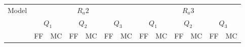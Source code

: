 \begin{table*}[h!]
\centering
\small
\begin{tabular}{l|p{0.7cm}p{0.6cm}|p{0.7cm}p{0.6cm}|p{0.7cm}p{0.6cm}|p{0.7cm}p{0.6cm}|p{0.7cm}p{0.6cm}|p{0.7cm}p{0.6cm}}
\hline
\multirow{3}{*}{Model} & \multicolumn{6}{c|}{$R_a2$}                                                               & \multicolumn{6}{c}{$R_a3$}                                                                \\ \cline{2-13}
                       & \multicolumn{2}{c}{$Q_1$} & \multicolumn{2}{c}{$Q_2$} & \multicolumn{2}{c|}{$Q_3$} & \multicolumn{2}{c}{$Q_1$} & \multicolumn{2}{c}{$Q_2$} & \multicolumn{2}{c}{$Q_3$} \\ \cline{2-13}
                       & FF           & MC           & FF           & MC           & FF            & MC           & FF           & MC           & FF           & MC           & FF           & MC           \\ \hline


\end{tabular}
\end{table*}
